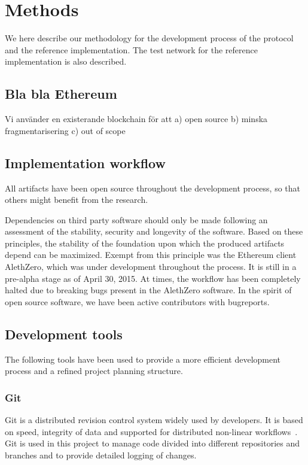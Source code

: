 \chapter{Methods}
We here describe our methodology for the development process of the protocol and the reference implementation. The test network for the reference implementation is also described.

\section{Bla bla Ethereum}
Vi använder en existerande blockchain för att a) open source b) minska fragmentarisering c) out of scope

\section{Implementation workflow}
All artifacts have been open source throughout the development process, so that others might benefit from the research.

Dependencies on third party software should only be made following an assessment of the stability, security and longevity of the software. Based on these principles, the stability of the foundation upon which the produced artifacts depend can be maximized. Exempt from this principle was the Ethereum client AlethZero, which was under development throughout the process. It is still in a pre-alpha stage as of April 30, 2015. At times, the workflow has been completely halted due to breaking bugs present in the AlethZero software. In the spirit of open source software, we have been active contributors with bugreports.

\section{Development tools}
The following tools have been used to provide a more efficient development process and a refined project planning structure.

\subsection{Git}
Git is a distributed revision control system widely used by developers. It is based on speed, integrity of data and supported for distributed non-linear workflows~\cite{git}. Git is used in this project to manage code divided into different repositories and branches and to provide detailed logging of changes. 

